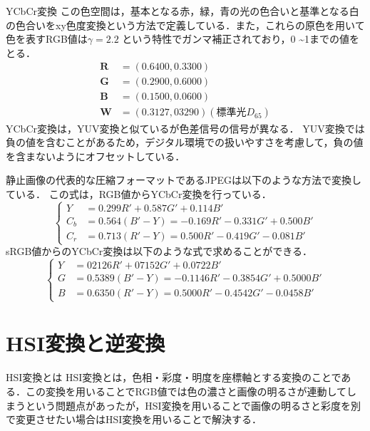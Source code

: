 \documentclass[8pt, jfont=ipaexm, t]{beamer} %
\begin{document}
\begin{frame}[allowframebreaks]{YCbCr変換}
この色空間は，基本となる赤，緑，青の光の色合いと基準となる白の色合いをxy色度変換という方法で定義している．また，これらの原色を用いて色を表すRGB値は\(\gamma = 2.2\)
という特性でガンマ補正されており，0 \textasciitilde 1までの値をとる．
\begin{equation}
\begin{aligned}
    \textbf{R} &= (0.6400, 0.3300) \\
    \textbf{G} &= (0.2900, 0.6000) \\
    \textbf{B} &= (0.1500, 0.0600) \\
    \textbf{W} &= (0.3127, 03290) (\text{標準光}D_{65})
\end{aligned}
\end{equation}
YCbCr変換は，YUV変換と似ているが色差信号の信号が異なる．
YUV変換では負の値を含むことがあるため，デジタル環境での扱いやすさを考慮して，負の値を含まないようにオフセットしている．
\newpage

静止画像の代表的な圧縮フォーマットであるJPEGは以下のような方法で変換している．
この式は，RGB値からYCbCr変換を行っている．
\begin{equation}
\begin{cases}
Y &= 0.299R' + 0.587G' + 0.114B' \\
C_b &= 0.564(B' - Y) = -0.169R' - 0.331G' + 0.500B' \\
C_r &= 0.713(R' - Y) = 0.500R' - 0.419G' -0.081B'
\end{cases}
\end{equation}
 sRGB値からのYCbCr変換は以下のような式で求めることができる．
\begin{equation}
\begin{cases}
Y &= 02126R' + 07152G' + 0.0722B' \\
G &= 0.5389(B' - Y) = -0.1146R' - 0.3854G' + 0.5000B' \\
B &= 0.6350(R' - Y) = 0.5000R' - 0.4542G' - 0.0458B'
\end{cases}
\end{equation}
\end{frame}

\section{HSI変換と逆変換}
\begin{frame}{HSI変換とは}
HSI変換とは，色相・彩度・明度を座標軸とする変換のことである．この変換を用いることでRGB値では色の濃さと画像の明るさが連動してしまうという問題点があったが，HSI変換を用いることで画像の明るさと彩度を別で変更させたい場合はHSI変換を用いることで解決する．
\end{frame}
\end{document}
